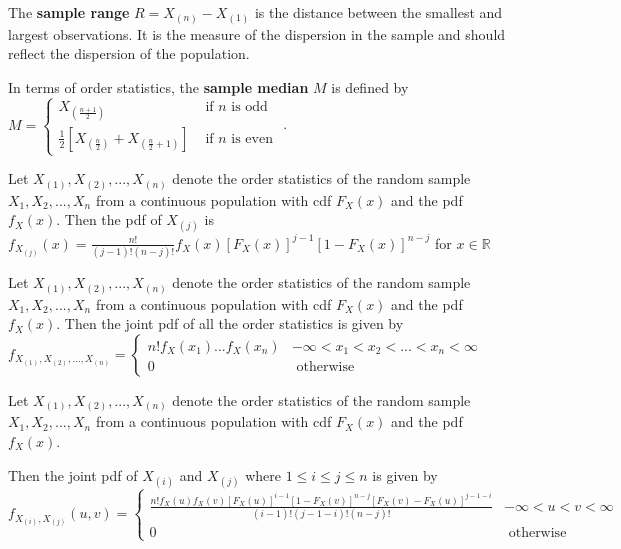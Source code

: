 \begin{defn}
    The \textbf{sample range} $R = X_{(n)} - X_{(1)}$ is the distance between the smallest and largest observations. It is the measure of the dispersion in the sample and should reflect the dispersion of the population.
\end{defn}

\begin{defn}
    In terms of order statistics, the \textbf{sample median} $M$ is defined by \\ 
    $M = \begin{cases} X_{(\frac{n+1}{2})} & \text{ if } n \text{ is odd } \\ \frac{1}{2} \left[ X_{(\frac{n}{2})} + X_{(\frac{n}{2} + 1)}\right] & \text{ if } n \text{ is even } \end{cases}$.
\end{defn}

\begin{thm}
    Let $X_{(1)}, X_{(2)}, ..., X_{(n)}$ denote the order statistics of the random sample $X_1, X_2, ..., X_n$ from a continuous population with cdf $F_X(x)$ and the pdf $f_X(x)$.
    Then the pdf of $X_{(j)}$ is 
    \\$f_{X_{(j)}}(x)= \displaystyle \frac{n!}{(j-1)! (n-j)!} f_X(x) [F_X(x)]^{j-1} [1-F_X(x)]^{n-j}$ for $x \in \mathbb{R}$
\end{thm}

\begin{thm}
    Let $X_{(1)}, X_{(2)}, ..., X_{(n)}$ denote the order statistics of the random sample $X_1, X_2, ..., X_n$ from a continuous population with cdf $F_X(x)$ and the pdf $f_X(x)$. Then the joint pdf of all the order statistics is given by
    \\$ f_{X_{(1)}, X_{(2)}, ..., X_{(n)}} = \begin{cases} n! f_X(x_1) ... f_X(x_n) & -\infty < x_1 < x_2 < ... < x_n < \infty \\ 0 & \text{ otherwise }\end{cases}$
\end{thm}

\begin{thm}
    Let $X_{(1)}, X_{(2)}, ..., X_{(n)}$ denote the order statistics of the random sample $X_1, X_2, ..., X_n$ from a continuous population with cdf $F_X(x)$ and the pdf $f_X(x)$.

    Then the joint pdf of $X_{(i)}$ and $X_{(j)}$ where $1 \leq i \leq j \leq n$ is given by \\ 
    $ f_{X_{(i)}, X_{(j)}}(u,v) = \begin{cases} \displaystyle \frac{n! f_X(u) f_X(v) [F_X(u)]^{i-1} [1-F_X(v)]^{n-j} [F_X(v) - F_X(u)]^{j-1-i}}{(i-1)!(j-1-i)!(n-j)!} & -\infty < u < v < \infty \\ 0 & \text{ otherwise } \end{cases}$
\end{thm}

